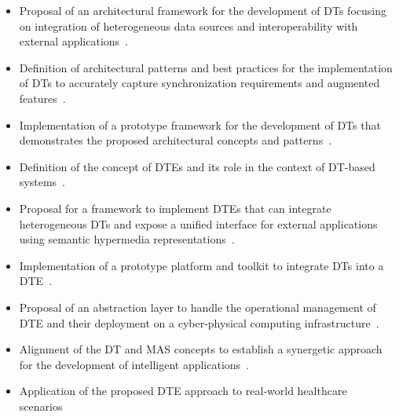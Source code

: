 \begin{itemize}
  \item Proposal of an architectural framework for the development of \acp{DT} focusing on integration of heterogeneous data sources and interoperability with external applications~\cite{11096178}.
  
  \item Definition of architectural patterns and best practices for the implementation of \acp{DT} to accurately capture synchronization requirements and augmented features~\cite{DBLP:conf/icsa/PiconeMBBFBGR25,11096160}.
  
  \item Implementation of a prototype framework for the development of \acp{DT} that demonstrates the proposed architectural concepts and patterns~\cite{11096247}.
  
  \item Definition of the concept of \acp{DTE} and its role in the context of \ac{DT}-based systems~\cite{giulianelli2025fgcs}.

  \item Proposal for a framework to implement \acp{DTE} that can integrate heterogeneous \acp{DT} and expose a unified interface for external applications using semantic hypermedia representations~\cite{giulianelli2025fgcs,DBLP:conf/models/GiulianelliBCR24,DBLP:conf/models/BurattiniZPR24}.
  
  \item Implementation of a prototype platform and toolkit to integrate \acp{DT} into a \ac{DTE}~\cite{GIULIANELLI2025102275}.
  
  \item Proposal of an abstraction layer to handle the operational management of \ac{DTE} and their deployment on a cyber-physical computing infrastructure~\cite{DBLP:conf/icccn/BarboneBMPRV24}.
  
  \item Alignment of the \ac{DT} and \ac{MAS} concepts to establish a synergetic approach for the development of intelligent applications~\cite{DBLP:journals/iot/BurattiniMMPR25,DBLP:conf/eumas/Burattini23}.
  
  \item Application of the proposed \ac{DTE} approach to real-world healthcare scenarios~\cite{DBLP:conf/percom/BurattiniMGGVZCR24,DBLP:conf/cbms/BurattiniMCGRLPT23}
\end{itemize}

